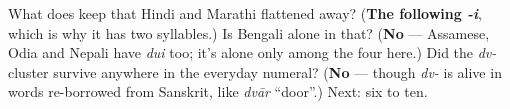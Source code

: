 \begin{tcolorbox}[breakable,colback=teal!4,colframe=teal!35!black,title={Before you move on}]
What does \textbf{} keep that Hindi and Marathi flattened away? (\textbf{The following \emph{-i}}, which is why it has two syllables.) Is Bengali alone in that? (\textbf{No} — Assamese, Odia and Nepali have \emph{dui} too; it's alone only among the four here.) Did the \emph{dv-} cluster survive anywhere in the everyday numeral? (\textbf{No} — though \emph{dv-} is alive in words re-borrowed from Sanskrit, like \emph{dvār} \textquotedblleft{}door\textquotedblright{}.) Next: six to ten.
\end{tcolorbox}
